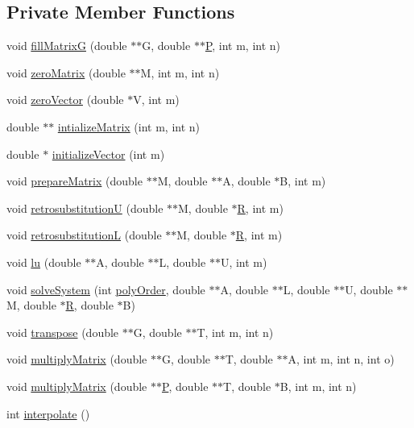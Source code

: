 \subsection*{Private Member Functions}
\begin{DoxyCompactItemize}
\item 
void \hyperlink{class_l_s_adbbd5b95ea2c0585098ddb6ea7ddeabc}{fill\+MatrixG} (double $\ast$$\ast$G, double $\ast$$\ast$\hyperlink{class_l_s_aef5aafb3950204592111d32c93721aa3}{P}, int m, int n)
\item 
void \hyperlink{class_l_s_a2825429a29497b5dbad69a8b77f42d00}{zero\+Matrix} (double $\ast$$\ast$M, int m, int n)
\item 
void \hyperlink{class_l_s_ae18a77376f05437d3072e7ad56d580cd}{zero\+Vector} (double $\ast$V, int m)
\item 
double $\ast$$\ast$ \hyperlink{class_l_s_a97eedf6376636d59fbe894909ab97ca0}{intialize\+Matrix} (int m, int n)
\item 
double $\ast$ \hyperlink{class_l_s_a29b451ca9a328e9e5c73d32886441439}{initialize\+Vector} (int m)
\item 
void \hyperlink{class_l_s_a84e538a99f84e3f72d3a89a725d9d7d8}{prepare\+Matrix} (double $\ast$$\ast$M, double $\ast$$\ast$A, double $\ast$B, int m)
\item 
void \hyperlink{class_l_s_a092e4964121ae088307af8622af7ab64}{retrosubstitutionU} (double $\ast$$\ast$M, double $\ast$\hyperlink{class_l_s_ade8c978a7d99f10950790c0dfec9f556}{R}, int m)
\item 
void \hyperlink{class_l_s_ada47f10ff595a886a79bb0f4eacbe7d7}{retrosubstitutionL} (double $\ast$$\ast$M, double $\ast$\hyperlink{class_l_s_ade8c978a7d99f10950790c0dfec9f556}{R}, int m)
\item 
void \hyperlink{class_l_s_aadf10e2c4121ce5f0b42981f7c1d15d7}{lu} (double $\ast$$\ast$A, double $\ast$$\ast$L, double $\ast$$\ast$U, int m)
\item 
void \hyperlink{class_l_s_afa8644e9204234a188c3ea0269b4b039}{solve\+System} (int \hyperlink{class_l_s_aecf61c51ef6717acc81b737e298e4236}{poly\+Order}, double $\ast$$\ast$A, double $\ast$$\ast$L, double $\ast$$\ast$U, double $\ast$$\ast$M, double $\ast$\hyperlink{class_l_s_ade8c978a7d99f10950790c0dfec9f556}{R}, double $\ast$B)
\item 
void \hyperlink{class_l_s_a405e4288332cf4165c5cbacdbfc82783}{transpose} (double $\ast$$\ast$G, double $\ast$$\ast$T, int m, int n)
\item 
void \hyperlink{class_l_s_a067388604231d6870b42b1e8356c06b5}{multiply\+Matrix} (double $\ast$$\ast$G, double $\ast$$\ast$T, double $\ast$$\ast$A, int m, int n, int o)
\item 
void \hyperlink{class_l_s_a7dc904604ca90e5b711d4c58eda51fcb}{multiply\+Matrix} (double $\ast$$\ast$\hyperlink{class_l_s_aef5aafb3950204592111d32c93721aa3}{P}, double $\ast$$\ast$T, double $\ast$B, int m, int n)
\item 
int \hyperlink{class_l_s_a1657c109024e802aee886d293778079f}{interpolate} ()
\end{DoxyCompactItemize}
